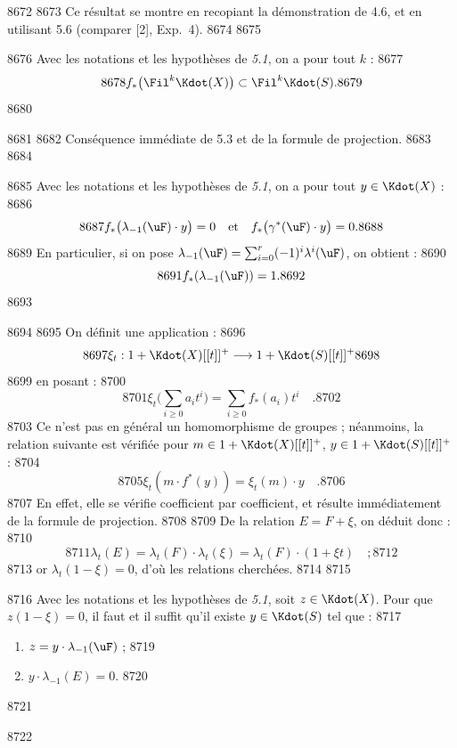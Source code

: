   8672	
  8673	Ce r\'esultat se montre en recopiant la d\'emonstration de 4.6, et en utilisant 5.6 (comparer [2], Exp.~4).
  8674	
  8675	\begin{corollaire}[5.8]
  8676	Avec les notations et les hypoth\`eses de \emph{5.1}, on a pour tout $k$ :
  8677	\[
  8678	f_{*}\bigl(\Fil^k \Kdot(X)\bigr) \subset \Fil^k \Kdot(S).
  8679	\]
  8680	\end{corollaire}
  8681	
  8682	Cons\'equence imm\'ediate de 5.3 et de la formule de projection.
  8683	
  8684	\begin{proposition}[5.9]
  8685	Avec les notations et les hypoth\`eses de \emph{5.1}, on a pour tout $y \in \Kdot(X)$ :
  8686	\[
  8687	f_{*}\bigl(\lambda_{-1}(\uF) \cdot y\bigr) = 0 \quad \text{et} \quad f_{*}\bigl(\gamma^{*}(\uF) \cdot y\bigr) = 0.
  8688	\]
  8689	En particulier, si on pose $\lambda_{-1}(\uF) = \sum_{i=0}^{r} (-1)^i \lambda^i(\uF)$, on obtient :
  8690	\[
  8691	f_{*}(\lambda_{-1}(\uF)) = 1.
  8692	\]
  8693	\end{proposition}
  8694	
  8695	On d\'efinit une application :
  8696	\[
  8697	\xi_t : 1 + \Kdot(X)[[t]]^{+} \longrightarrow 1 + \Kdot(S)[[t]]^{+}
  8698	\]
  8699	en posant :
  8700	\[
  8701	\xi_t\bigl(\sum_{i \geq 0} a_i t^i\bigr) = \sum_{i \geq 0} f_{*}(a_i) t^i \quad .
  8702	\]
  8703	Ce n'est pas en g\'en\'eral un homomorphisme de groupes ; n\'eanmoins, la relation suivante est v\'erifi\'ee pour $m \in 1 + \Kdot(X)[[t]]^{+}$, $y \in 1 + \Kdot(S)[[t]]^{+}$ :
  8704	\[
  8705	\xi_t(m \cdot f^{*}(y)) = \xi_t(m) \cdot y \quad .
  8706	\]
  8707	En effet, elle se v\'erifie coefficient par coefficient, et r\'esulte imm\'ediatement de la formule de projection.
  8708	
  8709	De la relation $E = F + \xi$, on d\'eduit donc :
  8710	\[
  8711	\lambda_t(E) = \lambda_t(F) \cdot \lambda_t(\xi) = \lambda_t(F) \cdot (1 + \xi t) \quad ;
  8712	\]
  8713	or $\lambda_t(1 - \xi) = 0$, d'o\`u les relations cherch\'ees.
  8714	
  8715	\begin{proposition}[5.10]
  8716	Avec les notations et les hypoth\`eses de \emph{5.1}, soit $z \in \Kdot(X)$. Pour que $z(1 - \xi) = 0$, il faut et il suffit qu'il existe $y \in \Kdot(S)$ tel que :
  8717	\begin{enumerate}[label=\roman*)]
  8718	\item $z = y \cdot \lambda_{-1}(\uF)$ ;
  8719	\item $y \cdot \lambda_{-1}(E) = 0$.
  8720	\end{enumerate}
  8721	\end{proposition}
  8722	
